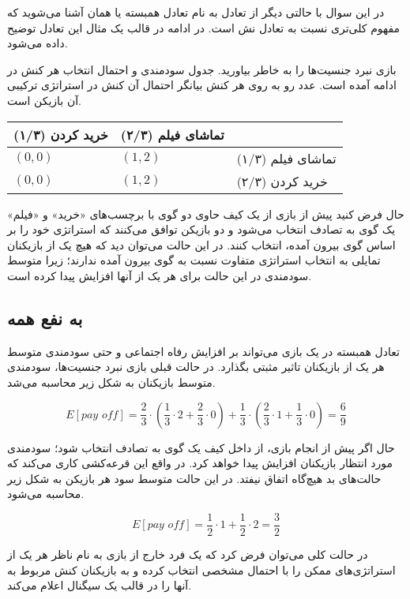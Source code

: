 در این سوال با حالتی دیگر از تعادل به نام تعادل همبسته یا همان
آشنا می‌شوید که مفهوم کلی‌تری نسبت به تعادل نش است. در ادامه در قالب یک مثال این تعادل توضیح داده می‌شود.

بازی نبرد جنسیت‌ها را به خاطر بیاورید. جدول سودمندی و احتمال انتخاب هر کنش در ادامه آمده است. عدد رو به روی هر کنش بیانگر احتمال آن کنش در استراتژی ترکیبی آن بازیکن است.
\begin{center}
\begin{tabularx}{0.7\textwidth}{|Y|Y|Y|}
    \hline
    خرید کردن (۱/۳) & تماشای فیلم (۲/۳) &  \\
    \hline
    $(0, 0)$ & $(1,2)$ & تماشای فیلم (۱/۳) \\
    \hline
    $(0, 0)$ & $(1,2)$ & خرید کردن (۲/۳) \\
    \hline
\end{tabularx}
\end{center}
حال فرض کنید پیش از بازی از یک کیف حاوی دو گوی با برچسب‌های «خرید» و «فیلم» یک گوی به تصادف انتخاب می‌شود و دو بازیکن توافق می‌کنند که استراتژی خود را بر اساس گوی بیرون آمده، انتخاب کنند. در این حالت می‌توان دید که هیچ یک از بازیکنان تمایلی به انتخاب استراتژی متفاوت نسبت به گوی بیرون آمده ندارند؛ زیرا متوسط سودمندی در این حالت برای هر یک از آنها افزایش پیدا کرده است.

\subsection*{به نفع همه}
تعادل همبسته در یک بازی می‌تواند بر افزایش رفاه اجتماعی و حتی سودمندی متوسط هر یک از بازیکنان تاثیر مثبتی بگذارد. 
در حالت قبلی بازی نبرد جنسیت‌ها، سودمندی متوسط بازیکنان به شکل زیر محاسبه می‌شد.

$$E[pay\,\,off] = \frac{2}{3} \cdot (\frac{1}{3} \cdot 2 + \frac{2}{3} \cdot 0) + \frac{1}{3} \cdot (\frac{2}{3} \cdot 1 + \frac{1}{3} \cdot 0) = \frac{6}{9}$$

حال اگر پیش از انجام بازی، از داخل کیف یک گوی به تصادف انتخاب شود؛ سودمندی مورد انتظار بازیکنان افزایش پیدا خواهد کرد. در واقع این قرعه‌کشی کاری می‌کند که حالت‌های بد هیچ‌گاه اتفاق نیفتد. در این حالت متوسط سود هر بازیکن به شکل زیر محاسبه می‌شود.

$$E[pay\,\,off] = \frac{1}{2} \cdot 1 + \frac{1}{2} \cdot 2 = \frac{3}{2}$$

در حالت کلی می‌توان فرض کرد که یک فرد خارج از بازی به نام ناظر هر یک از استراتژی‌های ممکن را با احتمال مشخصی انتخاب کرده و به بازیکنان کنش مربوط به آنها را در قالب یک سیگنال اعلام می‌کند.

